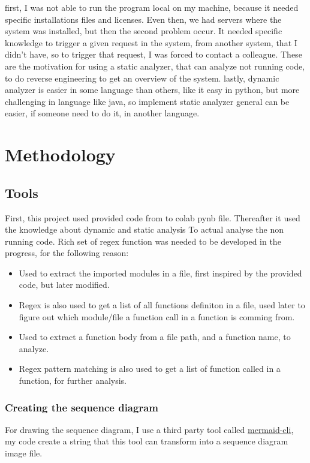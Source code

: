 \documentclass[12pt,a4paper]{report}
\begin{document}
    first, I was not able to run the program local on my machine, because it needed specific installations files and licenses. Even then, we had servers where the system was installed, but then the second problem occur. It needed specific knowledge to trigger a given request in the system, from another system, that I didn’t have, so to trigger that request, I was forced to contact a colleague. These are the motivation for using a static analyzer, that can analyze not running code, to do reverse engineering to get an overview of the system. lastly, dynamic analyzer is easier in some language than others, like it easy in python, but more challenging in language like java, so implement static analyzer general can be easier, if someone need to do it, in another language.
    


    \chapter{Methodology}
    
    \section{Tools}
    First, this project used provided code from to colab pynb file. Thereafter it used the knowledge about dynamic and static analysis To actual analyse the non running code. Rich set of regex function was needed to be developed in the progress, for the following reason: 
    \begin{itemize}
        \item Used to extract the imported modules in a file, first inspired by the provided code, but later modified. 
        \item Regex is also used to get a list of all functions definiton in a file, used later to figure out which module/file a function call in a function is comming from. 
        \item Used to extract a function body from a file path, and a function name, to analyze. 
        \item Regex pattern matching is also used to get a list of function called in a function, for further analysis. 
    \end{itemize}
    
    \subsection{Creating the sequence diagram}
    For drawing the sequence diagram, I use a third party tool called 
     \href{https://github.com/mermaid-js/mermaid-cli}{mermaid-cli}, my code create a string that this tool can transform into a sequence diagram image file. 
\end{document}
